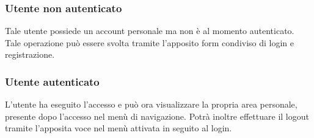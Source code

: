 \subsubsection{Utente non autenticato} Tale utente possiede un account personale ma non è al momento autenticato. Tale operazione può essere svolta tramite l'apposito form condiviso di login e registrazione.
\subsubsection{Utente autenticato} L'utente ha eseguito l'accesso e può ora visualizzare la propria area personale, presente dopo l'accesso nel menù di navigazione. Potrà inoltre effettuare il logout tramite l'apposita voce nel menù attivata in seguito al login.




